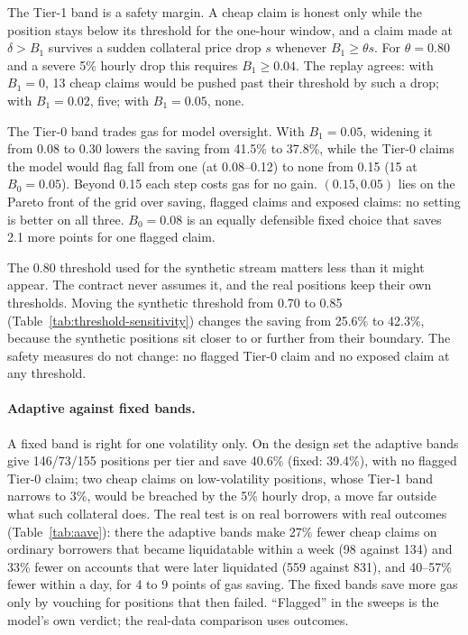 \documentclass[sigconf,nonacm]{acmart}
\begin{document}
The Tier-1 band is a safety margin. A cheap claim is honest only while the position stays below its threshold for the one-hour window, and a claim made at $\delta > B_1$ survives a sudden collateral price drop $s$ whenever $B_1 \ge \theta s$. For $\theta=0.80$ and a severe 5\% hourly drop this requires $B_1 \ge 0.04$. The replay agrees: with $B_1=0$, 13 cheap claims would be pushed past their threshold by such a drop; with $B_1=0.02$, five; with $B_1=0.05$, none.

The Tier-0 band trades gas for model oversight. With $B_1=0.05$, widening it from 0.08 to 0.30 lowers the saving from 41.5\% to 37.8\%, while the Tier-0 claims the model would flag fall from one (at 0.08--0.12) to none from 0.15 (15 at $B_0=0.05$). Beyond 0.15 each step costs gas for no gain. $(0.15, 0.05)$ lies on the Pareto front of the grid over saving, flagged claims and exposed claims: no setting is better on all three. $B_0=0.08$ is an equally defensible fixed choice that saves 2.1 more points for one flagged claim.

The 0.80 threshold used for the synthetic stream matters less than it might appear. The contract never assumes it, and the real positions keep their own thresholds. Moving the synthetic threshold from 0.70 to 0.85 (Table~\ref{tab:threshold-sensitivity}) changes the saving from 25.6\% to 42.3\%, because the synthetic positions sit closer to or further from their boundary. The safety measures do not change: no flagged Tier-0 claim and no exposed claim at any threshold.

\paragraph{Adaptive against fixed bands.} A fixed band is right for one volatility only. On the design set the adaptive bands give 146/73/155 positions per tier and save 40.6\% (fixed: 39.4\%), with no flagged Tier-0 claim; two cheap claims on low-volatility positions, whose Tier-1 band narrows to 3\%, would be breached by the 5\% hourly drop, a move far outside what such collateral does. The real test is on real borrowers with real outcomes (Table~\ref{tab:aave}): there the adaptive bands make 27\% fewer cheap claims on ordinary borrowers that became liquidatable within a week (98 against 134) and 33\% fewer on accounts that were later liquidated (559 against 831), and 40--57\% fewer within a day, for 4 to 9 points of gas saving. The fixed bands save more gas only by vouching for positions that then failed. ``Flagged'' in the sweeps is the model's own verdict; the real-data comparison uses outcomes.
\end{document}
